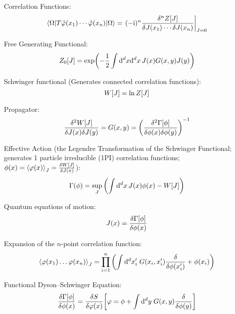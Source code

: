 			\noindent
			Correlation Functions:
			\begin{equation}
				\mel**{\Omega}{T \hat{\varphi}(x_1) \dotsb \hat{\varphi}(x_n)}{\Omega} = \eval{(-\i)^{n} \frac{\delta^n Z[J]}{\delta J(x_1) \dotsb \delta J(x_n)}}_{J=0}
			\end{equation}

			\noindent
			Free Generating Functional:
			\begin{equation}
				Z_0\qty[J] = \exp(-\frac{1}{2}\int\dd^d x \dd^d x\, J(x) G(x,y)J(y))
			\end{equation}

			\noindent
			Schwinger functional (Generates connected correlation functions):
			\begin{equation}
				W\qty[J] = \ln Z\qty[J]
			\end{equation}

			\noindent
			Propagator:
			\begin{equation}
				\frac{\delta^2 W[J]}{\delta J(x) \delta J(y)} = G(x,y) = \qty(\frac{\delta^2\Gamma[\phi]}{\delta \phi(x) \delta \phi(y)})^{-1}
			\end{equation}

			\noindent
			Effective Action (\ie the Legendre Transformation of the Schwinger Functional; generates 1 particle irreducible (1PI) correlation functions; $\phi(x) = \Avg{\varphi(x)}_J = \fdv{W\qty[J]}{J(x)}$):
			\begin{equation}
				\Gamma(\phi) = \sup_{J} \qty( \int \dd^d x \, J(x) \phi(x) - W[J])
			\end{equation}

			\noindent
			Quantum equations of motion:
			\begin{equation}
				J(x)=\fdv{\Gamma\qty[\phi]}{\phi(x)}
			\end{equation}

			\noindent
			Expansion of the $n$-point correlation function:
			\begin{equation}
				\Avg{\varphi(x_1) \hdots\varphi(x_n)}_J = \prod_{i=1}^{n} \qty(\int \dd^d x'_i \;G(x_i,x'_i) \fdv{\phi(x'_i)} + \phi(x_i))
			\end{equation}

			\noindent
			Functional Dyson--Schwinger Equation:
			\begin{equation}
				\fdv{\Gamma[\phi]}{\phi(x)} = \fdv{S}{\varphi(x)}\qty[\varphi = \phi + \int \dd^d y\; G(x,y) \fdv{}{\phi(y)}]
			\end{equation}


